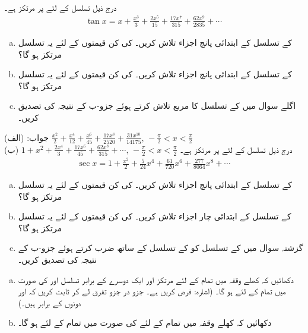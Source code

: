 درج ذیل تسلسل  کے لئے  پر مرتکز ہے۔
\begin{align*}
\tan x=x+\frac{x^3}{3}+\frac{2x^5}{15}+\frac{17x^7}{315}+\frac{62x^9}{2835}+\cdots
\end{align*}
\begin{enumerate}[a.]
\item
{} کے تسلسل کے ابتدائی پانچ اجزاء تلاش کریں۔  کی کن  قیمتوں کے لئے یہ تسلسل مرتکز ہو گا؟
\item
{} کے تسلسل کے ابتدائی پانچ اجزاء تلاش کریں۔  کی کن  قیمتوں کے لئے یہ تسلسل مرتکز ہو گا؟
\item
اگلے سوال میں  کے تسلسل کا مربع تلاش کرتے ہوئے جزو-ب کے نتیجہ کی تصدیق کریں۔
\end{enumerate}
جواب:\quad
(الف) 
$\tfrac{x^2}{2}+\tfrac{x^4}{12}+\tfrac{x^6}{45}+\tfrac{17x^8}{2520}+\tfrac{31x^{10}}{14175},\,-\tfrac{\pi}{2}<x<\tfrac{\pi}{2}$ \\
(ب)
$1+x^2+\tfrac{2x^4}{3}+\tfrac{17x^6}{45}+\tfrac{62x^8}{315}+\cdots,\, -\tfrac{\pi}{2}<x<\tfrac{\pi}{2}$
درج ذیل تسلسل  کے لئے  پر مرتکز ہے۔
\begin{align*}
\sec x=1+\frac{x^2}{2}+\frac{5}{24}x^4+\frac{61}{720}x^6+\frac{277}{8064}x^8+\cdots
\end{align*}
\begin{enumerate}[a.]
\item
{} کے تسلسل کے ابتدائی پانچ اجزاء تلاش کریں۔  کی کن  قیمتوں کے لئے یہ تسلسل مرتکز ہو گا؟
\item
{} کے تسلسل کے ابتدائی چار اجزاء تلاش کریں۔  کی کن  قیمتوں کے لئے یہ تسلسل مرتکز ہو گا؟
\item
گزشتہ سوال میں  کے تسلسل کو  کے تسلسل کے ساتھ ضرب کرتے ہوئے جزو-ب کے نتیجہ کی تصدیق کریں۔
\end{enumerate}
\begin{enumerate}[a.]
\item
دکھائیں کہ کھلے وقفہ  میں تمام  کے لئے مرتکز اور ایک دوسرے کے برابر تسلسل  اور  کی صورت میں تمام  کے لئے  ہو گا۔ (اشارہ: فرض کریں  ہے۔ جزو در جزو تفرق لے کر ثابت کریں کہ  اور  دونوں  کے برابر ہیں۔)
\item
دکھائیں کہ کھلے وقفہ  میں تمام  کے لئے  کی صورت میں تمام  کے لئے  ہو گا۔
\end{enumerate}
